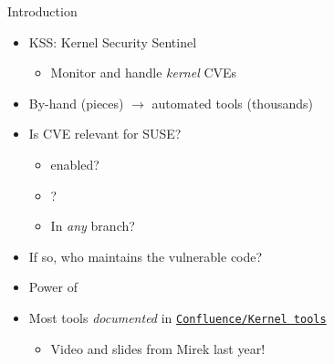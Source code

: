 \begin{frame}[fragile]{Introduction}
  \begin{itemize}[<+->]
    \item KSS: Kernel Security Sentinel
      \begin{itemize}[<.->]
	\item Monitor and handle \emph{kernel} CVEs
      \end{itemize}
    \item By-hand (pieces) $\rightarrow$ automated tools (thousands)
    \item Is CVE relevant for SUSE?
      \begin{itemize}
	\item {} enabled?
	\item {}?
	\item In \emph{any} branch?
      \end{itemize}
    \item If so, who maintains the vulnerable code?
    \item Power of 
    \item Most tools \emph{documented} in
      \href{https://confluence.suse.com/spaces/labs/pages/1833140703/Kernel+tools}{\texttt{Confluence/Kernel tools}}
      \begin{itemize}
	\item Video and slides from Mirek last year!
      \end{itemize}
  \end{itemize}

\end{frame}

\section{}
\frame{\sectionpage}

